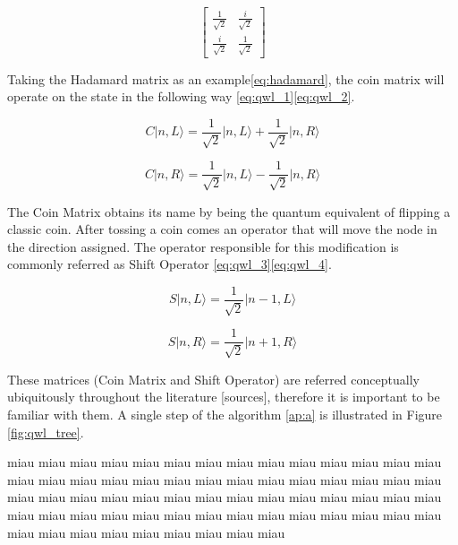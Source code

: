 \begin{equation}
\label{eq:qwl_symmetric}
\left[\begin{array}{cc}
\frac{1}{\sqrt{2}} & \frac{i}{\sqrt{2}}\\
\frac{i}{\sqrt{2}} & \frac{1}{\sqrt{2}}
\end{array}\right]
\end{equation}

Taking the Hadamard matrix as an example\ref{eq:hadamard}, the coin matrix will operate on the state in the following way \ref{eq:qwl_1}\ref{eq:qwl_2}\cite{Ambainis}.

\begin{equation}
\label{eq:qwl_1}
C\vert n, L\rangle = \frac{1}{\sqrt{2}} \vert n, L\rangle + \frac{1}{\sqrt{2}} \vert n, R\rangle
\end{equation}
  
\begin{equation}
\label{eq:qwl_2}
C\vert n, R\rangle = \frac{1}{\sqrt{2}} \vert n, L\rangle - \frac{1}{\sqrt{2}} \vert n, R\rangle
\end{equation} 

The Coin Matrix obtains its name by being the quantum equivalent of flipping a classic coin. After tossing a coin comes an operator that will move the node in the direction assigned. The operator responsible for this modification is commonly referred as Shift Operator \ref{eq:qwl_3}\ref{eq:qwl_4}. 

\begin{equation}
\label{eq:qwl_3}
S\vert n, L\rangle = \frac{1}{\sqrt{2}} \vert n-1, L\rangle
\end{equation}

\begin{equation}
\label{eq:qwl_4}
S\vert n, R\rangle = \frac{1}{\sqrt{2}} \vert n+1, R\rangle
\end{equation} 

These matrices (Coin Matrix and Shift Operator) are referred conceptually ubiquitously throughout the literature [sources], therefore it is important to be familiar with them. A single step of the algorithm \ref{ap:a} is illustrated in Figure \ref{fig:qwl_tree}.

miau miau miau miau miau miau miau miau miau miau miau miau miau miau miau miau miau miau miau miau miau miau miau miau miau miau miau miau miau miau miau miau miau miau miau miau miau miau miau miau miau miau miau miau miau miau miau miau miau miau miau miau miau miau miau miau miau miau miau miau miau miau miau miau miau 

